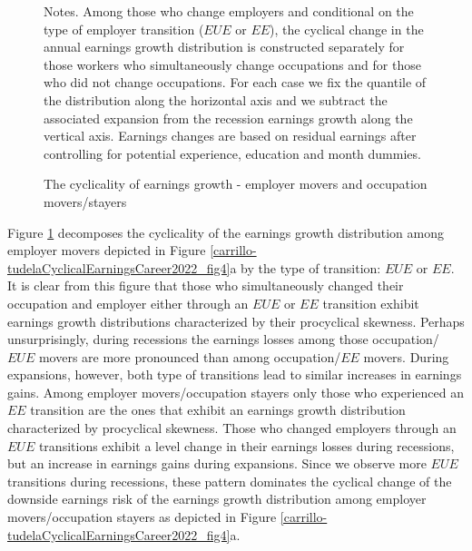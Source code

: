 \documentclass[12pt]{article}
\theoremstyle{definition}
\begin{document}
\begin{figure}[H]
    \noindent\caption{The cyclicality of earnings growth - employer movers and occupation movers/stayers}
    \begin{center}
    \end{center}
    \vspace{-20pt}
    {\footnotesize Notes. Among those who change employers and conditional on the type of employer transition ($EUE$ or $EE$), the cyclical change in the annual earnings growth distribution is constructed separately for those workers who simultaneously change occupations and for those who did not change occupations. For each case we fix the quantile of the distribution along the horizontal axis and we subtract the associated expansion from the recession earnings growth along the vertical axis. Earnings changes are based on residual earnings after controlling for potential experience, education and month dummies.}
    \label{carrillo-tudelaCyclicalEarningsCareer2022_fig5}
\end{figure}

Figure \ref{carrillo-tudelaCyclicalEarningsCareer2022_fig5} decomposes the cyclicality of the earnings growth distribution among employer movers  depicted in Figure \ref{carrillo-tudelaCyclicalEarningsCareer2022_fig4}a by the type of transition: $EUE$ or $EE$. It is clear from this figure that those who simultaneously changed their occupation and employer either through an $EUE$ or $EE$ transition exhibit earnings growth distributions characterized by their procyclical skewness. Perhaps unsurprisingly, during recessions the earnings losses among those occupation/$EUE$ movers are more pronounced than among occupation/$EE$ movers. During expansions, however, both type of transitions lead to similar increases in earnings gains. Among employer movers/occupation stayers only those who experienced an $EE$ transition are the ones that exhibit an earnings growth distribution characterized by procyclical skewness. Those who changed employers through an $EUE$ transitions exhibit a level change in their earnings losses during recessions, but an increase in earnings gains during expansions. Since we observe more $EUE$ transitions during recessions, these pattern dominates the cyclical change of the downside earnings risk of the earnings growth distribution among employer movers/occupation stayers as depicted in Figure \ref{carrillo-tudelaCyclicalEarningsCareer2022_fig4}a.
\end{document}
